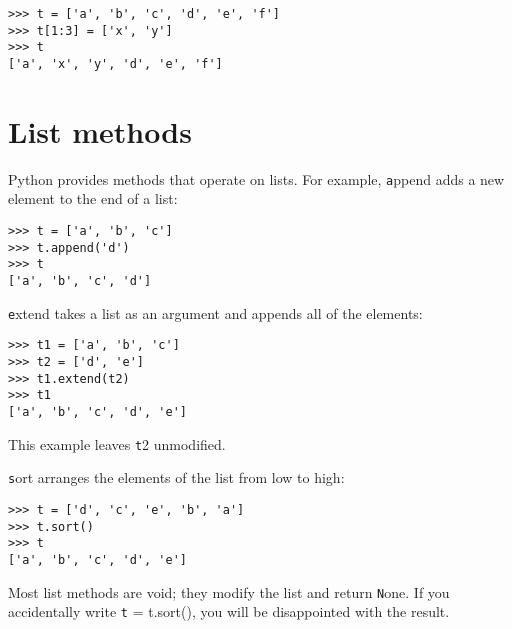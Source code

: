 \documentclass[
DIV=11,
fontsize=13,
twoside,
headinclude=false,
titlepage=firstiscover,
abstract=true,
headsepline=true,
footsepline=true,
chapterprefix=true, %
headings=big,
bibliography=totoc,%
captions=tableheading
]{scrbook}
\theoremstyle{definition}
\begin{document}
\begin{lstlisting}
>>> t = ['a', 'b', 'c', 'd', 'e', 'f']
>>> t[1:3] = ['x', 'y']
>>> t
['a', 'x', 'y', 'd', 'e', 'f']
\end{lstlisting}
%


%

%


\section{List methods}

Python provides methods that operate on lists.  For example,
{\texttt append} adds a new element to the end of a list:

\begin{lstlisting}
>>> t = ['a', 'b', 'c']
>>> t.append('d')
>>> t
['a', 'b', 'c', 'd']
\end{lstlisting}
%
{\texttt extend} takes a list as an argument and appends all of
the elements:

\begin{lstlisting}
>>> t1 = ['a', 'b', 'c']
>>> t2 = ['d', 'e']
>>> t1.extend(t2)
>>> t1
['a', 'b', 'c', 'd', 'e']
\end{lstlisting}
%
This example leaves {\texttt t2} unmodified.

{\texttt sort} arranges the elements of the list from low to high:

\begin{lstlisting}
>>> t = ['d', 'c', 'e', 'b', 'a']
>>> t.sort()
>>> t
['a', 'b', 'c', 'd', 'e']
\end{lstlisting}
%
Most list methods are void; they modify the list and return {\texttt None}.
If you accidentally write {\texttt t = t.sort()}, you will be disappointed
with the result.
\end{document}
